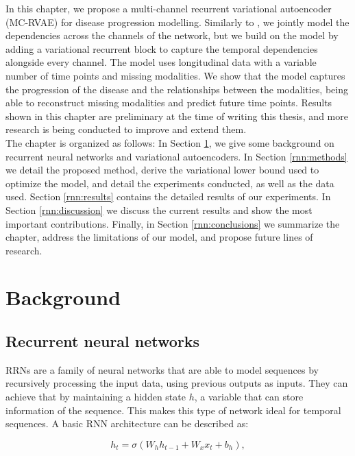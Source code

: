 In this chapter, we propose a multi-channel recurrent variational autoencoder  (MC-RVAE) for disease progression modelling. Similarly to \cite{Antelmi2019}, we jointly model the dependencies across the channels of the network, but we build on the model by adding a variational recurrent block to capture the temporal dependencies alongside every channel. The model uses longitudinal data with a variable number of time points and missing modalities. We show that the model captures the progression of the disease and the relationships between the modalities, being able to reconstruct missing modalities and predict future time points. Results shown in this chapter are preliminary at the time of writing this thesis, and more research is being conducted to improve and extend them. \\

The chapter is organized as follows: In Section \ref{rnn:background}, we give some background on recurrent neural networks and variational autoencoders. In Section \ref{rnn:methods} we detail the proposed method, derive the variational lower bound used to optimize the model, and detail the experiments conducted, as well as the data used. Section \ref{rnn:results} contains the detailed results of our experiments. In Section \ref{rnn:discussion} we discuss the current results and show the most important contributions. Finally, in Section \ref{rnn:conclusions} we summarize the chapter, address the limitations of our model, and propose future lines of research.

\section{Background}
\label{rnn:background}

\subsection{Recurrent neural networks}

RRNs are a family of neural networks that are able to model sequences by recursively processing the input data, using previous outputs as inputs. They can achieve that by maintaining a hidden state $h$, a variable that can store information of the sequence. This makes this type of network ideal for temporal sequences. A basic RNN architecture can be described as:

\begin{equation}
    h_t = \mathit{\sigma}(W_h h_{t-1} + W_x x_{t} + b_h),
\end{equation}

